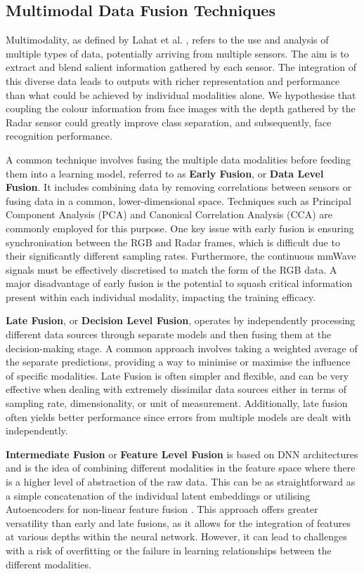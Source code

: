 \documentclass{interim}
\begin{document}
\subsection{Multimodal Data Fusion Techniques}
\label{background:multimodal_data_fusion_techniques}
Multimodality, as defined by Lahat et al. \cite{lahat2015multimodal}, refers to the use and analysis of multiple types of data, potentially arriving from multiple sensors. The aim is to extract and blend salient information gathered by each sensor. The integration of this diverse data leads to outputs with richer representation and performance than what could be achieved by individual modalities alone. We hypothesise that coupling the colour information from face images with the depth gathered by the Radar sensor could greatly improve class separation, and subsequently, face recognition performance.

A common technique involves fusing the multiple data modalities before feeding them into a learning model, referred to as \textbf{Early Fusion}, or \textbf{Data Level Fusion}. It includes combining data by removing correlations between sensors or fusing data in a common, lower-dimensional space. Techniques such as Principal Component Analysis (PCA) and Canonical Correlation Analysis (CCA) are commonly employed for this purpose. One key issue with early fusion is ensuring synchronisation between the RGB and Radar frames, which is difficult due to their significantly different sampling rates. Furthermore, the continuous mmWave signals must be effectively discretised to match the form of the RGB data. A major disadvantage of early fusion is the potential to squash critical information present within each individual modality, impacting the training efficacy.

\textbf{Late Fusion}, or \textbf{Decision Level Fusion}, operates by independently processing different data sources through separate models and then fusing them at the decision-making stage. A common approach involves taking a weighted average of the separate predictions, providing a way to minimise or maximise the influence of specific modalities. Late Fusion is often simpler and flexible, and can be very effective when dealing with extremely dissimilar data sources either in terms of sampling rate, dimensionality, or unit of measurement. Additionally, late fusion often yields better performance since errors from multiple models are dealt with independently.

\textbf{Intermediate Fusion} or \textbf{Feature Level Fusion} is based on DNN architectures and is the idea of combining different modalities in the feature space where there is a higher level of abstraction of the raw data. This can be as straightforward as a simple concatenation of the individual latent embeddings or utilising Autoencoders for non-linear feature fusion \cite{charte2018practical}. This approach offers greater versatility than early and late fusions, as it allows for the integration of features at various depths within the neural network. However, it can lead to challenges with a risk of overfitting or the failure in learning relationships between the different modalities.
\end{document}
